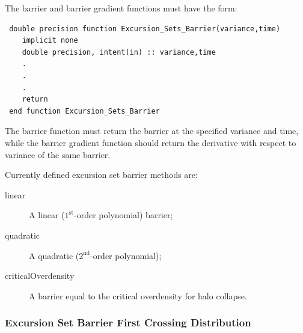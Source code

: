 The barrier and barrier gradient functions must have the form:
\begin{verbatim}
 double precision function Excursion_Sets_Barrier(variance,time)
    implicit none
    double precision, intent(in) :: variance,time
    .
    .
    .
    return
 end function Excursion_Sets_Barrier
\end{verbatim}
The barrier function must return the barrier at the specified {\normalfont \ttfamily variance} and {\normalfont \ttfamily time}, while the barrier gradient function should return the derivative with respect to variance of the same barrier.

Currently defined excursion set barrier methods are:
\begin{description}
 \item [{\normalfont \ttfamily linear}] A linear ($1^\mathrm{st}$-order polynomial) barrier;
  \item [{\normalfont \ttfamily quadratic}] A quadratic ($2^\mathrm{nd}$-order polynomial);
  \item [{\normalfont \ttfamily criticalOverdensity}] A barrier equal to the critical overdensity for halo collapse.
\end{description}

\subsubsection{Excursion Set Barrier First Crossing Distribution}\label{sec:excursionSetFirstCrossingMethod}

